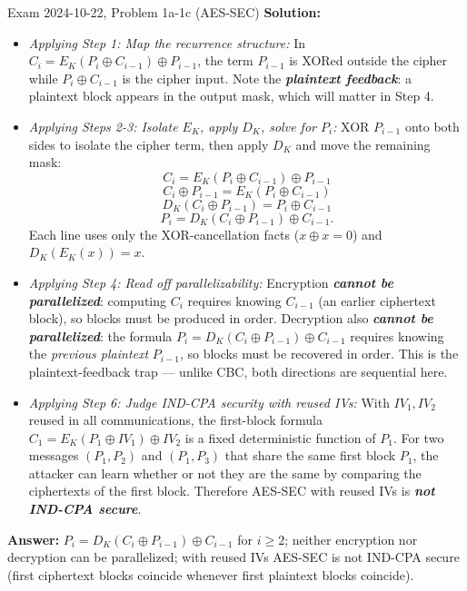 \documentclass[12pt, a4paper]{article}
\newcommand{\term}[1]{\textbf{\textit{#1}}}        %
\begin{document}
\begin{practicebox}{Exam 2024-10-22, Problem 1a-1c (AES-SEC)}
\textbf{Solution:}
\begin{itemize}
    \item \textit{Applying Step 1: Map the recurrence structure:} In $C_i = E_K(P_i \oplus C_{i-1}) \oplus P_{i-1}$, the term $P_{i-1}$ is XORed outside the cipher while $P_i \oplus C_{i-1}$ is the cipher input. Note the \term{plaintext feedback}: a plaintext block appears in the output mask, which will matter in Step 4.
    \item \textit{Applying Steps 2-3: Isolate $E_K$, apply $D_K$, solve for $P_i$:} XOR $P_{i-1}$ onto both sides to isolate the cipher term, then apply $D_K$ and move the remaining mask: \[ C_i = E_K(P_i \oplus C_{i-1}) \oplus P_{i-1} \] \[ C_i \oplus P_{i-1} = E_K(P_i \oplus C_{i-1}) \] \[ D_K(C_i \oplus P_{i-1}) = P_i \oplus C_{i-1} \] \[ P_i = D_K(C_i \oplus P_{i-1}) \oplus C_{i-1}. \] Each line uses only the XOR-cancellation facts ($x \oplus x = 0$) and $D_K(E_K(x)) = x$.
    \item \textit{Applying Step 4: Read off parallelizability:} Encryption \term{cannot be parallelized}: computing $C_i$ requires knowing $C_{i-1}$ (an earlier ciphertext block), so blocks must be produced in order. Decryption also \term{cannot be parallelized}: the formula $P_i = D_K(C_i \oplus P_{i-1}) \oplus C_{i-1}$ requires knowing the \emph{previous plaintext} $P_{i-1}$, so blocks must be recovered in order. This is the plaintext-feedback trap --- unlike CBC, both directions are sequential here.
    \item \textit{Applying Step 6: Judge IND-CPA security with reused IVs:} With $IV_1, IV_2$ reused in all communications, the first-block formula $C_1 = E_K(P_1 \oplus IV_1) \oplus IV_2$ is a fixed deterministic function of $P_1$. For two messages $(P_1, P_2)$ and $(P_1, P_3)$ that share the same first block $P_1$, the attacker can learn whether or not they are the same by comparing the ciphertexts of the first block. Therefore AES-SEC with reused IVs is \term{not IND-CPA secure}.
\end{itemize}
\textbf{Answer:} $P_i = D_K(C_i \oplus P_{i-1}) \oplus C_{i-1}$ for $i \geq 2$; neither encryption nor decryption can be parallelized; with reused IVs AES-SEC is not IND-CPA secure (first ciphertext blocks coincide whenever first plaintext blocks coincide).
\end{practicebox}
\end{document}
